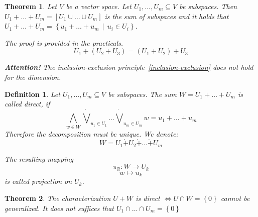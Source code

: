 \documentclass[a4paper,landscape,twocolumn]{article}
\newcommand\set[1]{\left\{#1\right\}}
\newcommand\setdef[2]{\left\{#1\,\middle|\,#2\right\}}
\newtheorem{theorem}{Theorem}
\newtheorem{defi}{Definition}
\begin{document}
\begin{theorem}
  \label{satz-4-12}
  Let $V$ be a vector space. Let $U_1, \dots, U_m \subseteq V$ be subspaces.
  Then $U_1 + \dots + U_m = [U_1 \cup \dots \cup U_m]$ is the \emph{sum of subspaces}
  and it holds that $U_1 + \dots + U_m = \setdef{u_1 + \dots + u_m}{u_i \in U_i}$.

  The proof is provided in the practicals.
  \[ U_1 + (U_2 + U_3) = (U_1 + U_2) + U_3 \]

  \textbf{Attention!}
  The inclusion-exclusion principle~\ref{inclusion-exclusion} does not hold for the dimension.
\end{theorem}

\begin{defi}
  Let $U_1, \dots, U_m \subseteq V$ be subspaces.
  The sum $W = U_1 + \dots + U_m$ is called \emph{direct}, if
  \[ \bigwedge_{w \in W} \dot\bigvee_{u_1 \in U_1} \dots \dot\bigvee_{u_m \in U_m} w = u_1 + \dots + u_m \]
  Therefore the decomposition must be unique. We denote:
  \[ W = U_1 \dot{+} U_2 \dot{+} \dots \dot{+} U_m \]

  The resulting mapping
  \[ \pi_{\mathbb R}: W \rightarrow U_k \]
  \[ w \mapsto u_k \]
  is called \emph{projection} on $U_k$.
\end{defi}

\begin{theorem}
  The characterization $U + W$ is direct $\Leftrightarrow U \cap W = \set{0}$
  cannot be generalized.
  It does not suffices that $U_1 \cap \dots \cap U_m = \set{0}$
\end{theorem}
\end{document}
